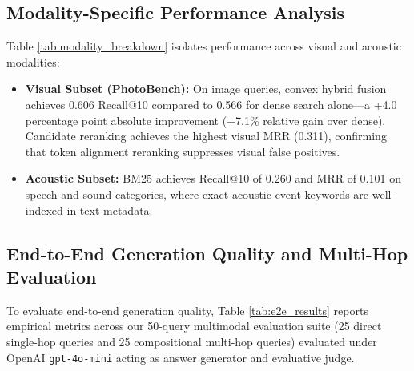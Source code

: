 \documentclass[conference]{IEEEtran}
\begin{document}
\subsection{Modality-Specific Performance Analysis}
Table \ref{tab:modality_breakdown} isolates performance across visual and acoustic modalities:
\begin{itemize}
    \item \textbf{Visual Subset (PhotoBench):} On image queries, convex hybrid fusion achieves 0.606 Recall@10 compared to 0.566 for dense search alone—a +4.0 percentage point absolute improvement (+7.1\% relative gain over dense). Candidate reranking achieves the highest visual MRR (0.311), confirming that token alignment reranking suppresses visual false positives.
    \item \textbf{Acoustic Subset:} BM25 achieves Recall@10 of 0.260 and MRR of 0.101 on speech and sound categories, where exact acoustic event keywords are well-indexed in text metadata.
\end{itemize}

\subsection{End-to-End Generation Quality and Multi-Hop Evaluation}
To evaluate end-to-end generation quality, Table \ref{tab:e2e_results} reports empirical metrics across our 50-query multimodal evaluation suite (25 direct single-hop queries and 25 compositional multi-hop queries) evaluated under OpenAI \texttt{gpt-4o-mini} \cite{openai2024gpt4o} acting as answer generator and evaluative judge.
\end{document}
